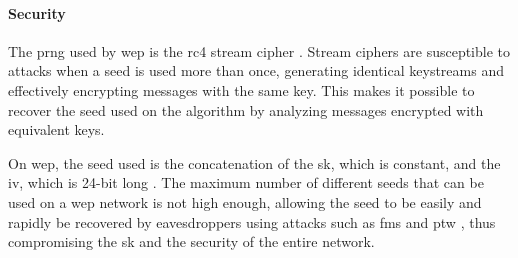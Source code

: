 \paragraph{Security}

The \gls{prng} used by \gls{wep} is the \gls{rc4} stream cipher \cite{ieee_80211_2020}. Stream ciphers are susceptible to attacks when a seed is used more than once, generating identical keystreams and effectively encrypting messages with the same key. This makes it possible to recover the seed used on the algorithm by analyzing messages encrypted with equivalent keys.

On \gls{wep}, the seed used is the concatenation of the \gls{sk}, which is constant, and the \gls{iv}, which is 24-bit long \cite{ieee_80211_2020}. The maximum number of different seeds that can be used on a \gls{wep} network is not high enough, allowing the seed to be easily and rapidly be recovered by eavesdroppers using attacks such as \gls{fms} \cite{fms} and \gls{ptw} \cite{ptw}, thus compromising the \gls{sk} and the security of the entire network.
